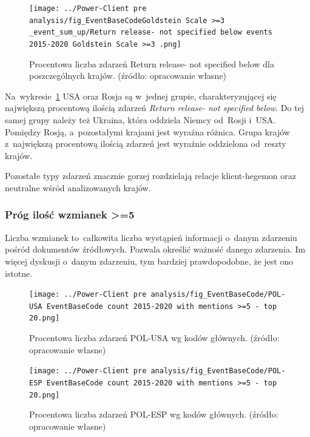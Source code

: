 \documentclass[11pt]{report}
\begin{document}
    \begin{figure}[tp]
        \centering
        \texttt{[image: ../Power-Client pre analysis/fig\_EventBaseCodeGoldstein Scale >=3 \_event\_sum\_up/Return release- not specified below events 2015-2020 Goldstein Scale >=3 .png]}
        \caption{Procentowa liczba zdarzeń Return release- not specified below dla poszczególnych krajów. (źródło: opracowanie własne)}
        \label{fig:Power-Client:ERC:Goldstein:SumUp:Return release- not specified below}
    \end{figure}

    Na~wykresie~\ref{fig:Power-Client:ERC:Goldstein:SumUp:Return release- not specified below} USA oraz Rosja są w~jednej grupie,
    charakteryzującej się największą procentową ilością zdarzeń \textit{Return release- not specified below}.
    Do tej samej grupy należy też Ukraina, która oddziela Niemcy od~Rosji i~USA\@.
    Pomiędzy Rosją, a~pozostałymi krajami jest wyraźna różnica.
    Grupa krajów z~największą procentową ilością zdarzeń jest wyraźnie oddzielona od~reszty krajów.

    Pozostałe typy zdarzeń znacznie gorzej rozdzielają relacje klient-hegemon oraz neutralne wśród analizowanych krajów.

    \subsubsection{Próg ilość wzmianek >=5}
    Liczba wzmianek to~całkowita liczba wystąpień informacji o~danym zdarzeniu pośród dokumentów źródłowych.
    Pozwala określić ważność danego zdarzenia.
    Im więcej dyskusji o~danym zdarzeniu, tym bardziej prawdopodobne, że jest ono istotne.

    \begin{figure}[tp]
        \centering
        \texttt{[image: ../Power-Client pre analysis/fig\_EventBaseCode/POL-USA EventBaseCode count 2015-2020 with mentions >=5 - top 20.png]}
        \caption{Procentowa liczba zdarzeń POL-USA wg kodów głównych. (źródło: opracowanie własne)}
        \label{fig:Power-Client:EBC:Mentions:POL-USA}
    \end{figure}

    \begin{figure}[tp]
        \centering
        \texttt{[image: ../Power-Client pre analysis/fig\_EventBaseCode/POL-ESP EventBaseCode count 2015-2020 with mentions >=5 - top 20.png]}
        \caption{Procentowa liczba zdarzeń POL-ESP wg kodów głównych. (źródło: opracowanie własne)}
        \label{fig:Power-Client:EBC:Mentions:POL-ESP}
    \end{figure}
\end{document}
